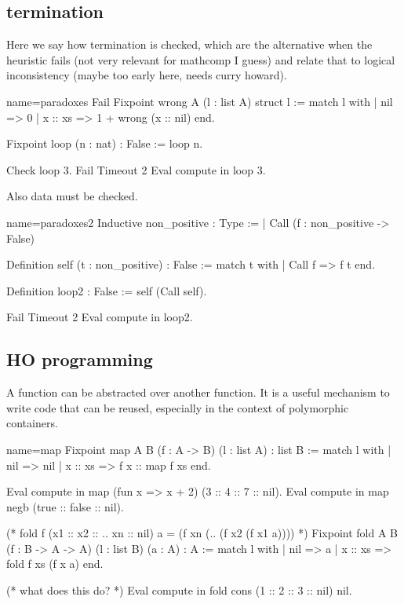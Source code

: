 \subsection{termination}

Here we say how termination is checked, which are the alternative when the
heuristic fails (not very relevant for mathcomp I guess) and relate that to
logical inconsistency (maybe too early here, needs curry howard).

\begin{coq}{name=paradoxes}{}
Fail
Fixpoint wrong A (l : list A) {struct l} :=
  match l with
  | nil => 0
  | x :: xs => 1 + wrong (x :: nil)
  end.

Fixpoint loop (n : nat) : False := loop n.

Check loop 3.
Fail Timeout 2 Eval compute in loop 3.
\end{coq}

Also data must be checked.

\begin{coq}{name=paradoxes2}{}
Inductive non_positive : Type :=
| Call (f : non_positive -> False)

Definition self (t : non_positive) : False :=
  match t with
  | Call f => f t
  end.

Definition loop2 : False := self (Call self).

Fail Timeout 2 Eval compute in loop2.
\end{coq}

\subsection{HO programming}

A function can be abstracted over another
   function.  It is a useful mechanism to write
   code that can be reused, especially in the context
   of polymorphic containers.

\begin{coq}{name=map}{}
Fixpoint map A B (f : A -> B) (l : list A) : list B :=
  match l with
  | nil => nil
  | x :: xs => f x :: map f xs
  end.

Eval compute in
  map (fun x => x + 2) (3 :: 4 :: 7 :: nil).
Eval compute in
  map negb (true :: false :: nil).

(* fold f (x1 :: x2 :: .. xn :: nil) a
     =
            (f xn (.. (f x2 (f x1 a))))
*)
Fixpoint fold A B (f : B -> A -> A) (l : list B) (a : A) : A :=
  match l with
  | nil => a
  | x :: xs => fold f xs (f x a)
  end.

(* what does this do? *)
Eval compute in fold cons (1 :: 2 :: 3 :: nil) nil.
\end{coq}

